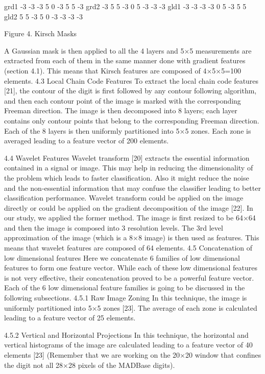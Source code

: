 \documentclass[conference]{IEEEtran}
\begin{document}
grd1
-3	-3	-3
5	0	-3
5	5	-3
	grd2
-3	5	5
-3	0	5
-3	-3	-3
	gld1
-3	-3	-3
-3	0	5
-3	5	5
	gld2
5	5	-3
5	0	-3
-3	-3	-3

Figure 4. Kirsch  Masks

A Gaussian mask is then applied to all the 4 layers and 5×5 measurements are extracted from each of them in the same manner done with gradient features (section 4.1). This means that Kirsch features are composed of 4×5×5=100 elements.
4.3 Local Chain Code Features
To extract the local chain code features [21], the contour of the digit is first followed by any contour following algorithm, and then each contour point of the image is marked with the corresponding Freeman direction. The image is then decomposed into 8 layers; each layer contains only contour points that belong to the corresponding Freeman direction. Each of the 8 layers is then uniformly partitioned into 5×5 zones. Each zone is averaged leading to a feature vector of 200 elements.


4.4 Wavelet Features
Wavelet transform [20] extracts the essential information contained in a signal or image. This may help in reducing the dimensionality of the problem which leads to faster classification. Also it might reduce the noise and the non-essential information that may confuse the classifier leading to better classification performance. Wavelet transform could be applied on the image directly or could be applied on the gradient decomposition of the image [22]. In our study, we applied the former method. The image is first resized to be 64×64 and then the image is composed into 3 resolution levels. The 3rd level approximation of the image (which is a 8×8 image) is then used as features. This means that wavelet features are composed of 64 elements.
4.5 Concatenation of low dimensional features
Here we concatenate 6 families of low dimensional features to form one feature vector. While each of these low dimensional features is not very effective, their concatenation proved to be a powerful feature vector. Each of the 6 low dimensional feature families is going to be discussed in the following subsections.
4.5.1 Raw Image Zoning
In this technique, the image is uniformly partitioned into 5×5 zones [23]. The average of each zone is calculated leading to a feature vector of 25 elements.

4.5.2 Vertical and Horizontal Projections
In this technique, the horizontal and vertical histograms of the image are calculated leading to a feature vector of 40 elements [23] (Remember that we are working on the 20×20 window that confines the digit not all 28×28 pixels of the MADBase digits).
\end{document}

